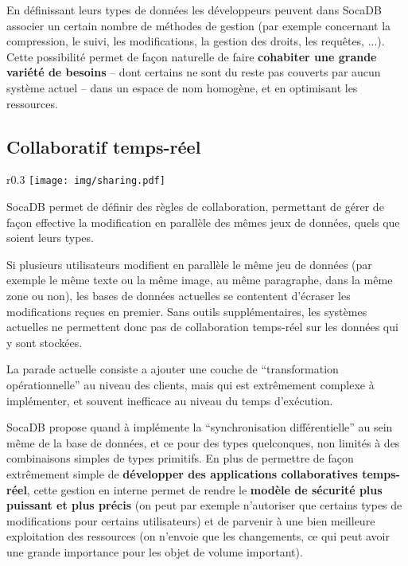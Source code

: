 \documentclass[a4paper,10pt]{scrreprt}
\begin{document}
            \medskip
            En définissant leurs types de données les développeurs peuvent dans SocaDB associer un certain nombre de méthodes de gestion (par exemple concernant la compression, le suivi, les modifications, la gestion des droits, les requêtes, ...). Cette possibilité permet de façon naturelle de faire \textbf{cohabiter une grande variété de besoins} -- dont certains ne sont du reste pas couverts par aucun système actuel -- dans un espace de nom homogène, et en optimisant les ressources.
            
        \subsection{Collaboratif temps-réel}

            \begin{wrapfigure}{r}{0.3\textwidth}
                \hfill
                \vspace{-1.2em}
                \texttt{[image: img/sharing.pdf]}
                \begin{center}
                \begin{scriptsize}
                    SocaDB permet de définir des règles de collaboration, permettant de gérer de façon effective la modification en parallèle des mêmes jeux de données, quels que soient leurs types.
                \end{scriptsize}
                \end{center}
            \end{wrapfigure}

            Si plusieurs utilisateurs modifient en parallèle le même jeu de données (par exemple le même texte ou la même image, au même paragraphe, dans la même zone ou non), les bases de données actuelles se contentent d'écraser les modifications reçues en premier. Sans outils supplémentaires, les systèmes actuelles ne permettent donc pas de collaboration temps-réel sur les données qui y sont stockées.
            
            La parade actuelle consiste a ajouter une couche de ``transformation opérationnelle'' au niveau des clients, mais qui est extrêmement complexe à implémenter, et souvent inefficace au niveau du temps d'exécution.
            
            \medskip
            SocaDB propose quand à implémente la ``synchronisation différentielle'' au sein même de la base de données, et ce pour des types quelconques, non limités à des combinaisons simples de types primitifs. En plus de permettre de façon extrêmement simple de \textbf{développer des applications collaboratives temps-réel}, cette gestion en interne permet de rendre le \textbf{modèle de sécurité plus puissant et plus précis} (on peut par exemple n'autoriser que certains types de modifications pour certains utilisateurs) et de parvenir à une bien meilleure exploitation des ressources (on n'envoie que les changements, ce qui peut avoir une grande importance pour les objet de volume important).
            
\end{document}
